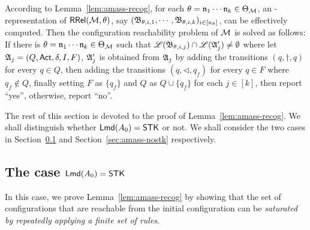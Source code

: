     According to Lemma~\ref{lem:amass-recog}, for each $\theta = \mathfrak{n}_1 \cdots \mathfrak{n}_k \in \Theta_{\mathcal{M} }$, an {\WOTrNFA}-representation of $\mathsf{RRel}({\mathcal{M} }, \theta)$, say $({\mathfrak{B} }_{\theta, i,1},\cdots,{\mathfrak{B} }_{\theta, i,k})_{i \in [n_\theta]}$, can be effectively computed. 
    Then the configuration reachability problem of ${\mathcal{M} }$ is solved as follows: If there is $\theta =  \mathfrak{n}_1 \cdots \mathfrak{n}_k \in \Theta_{\mathcal{M} }$ such that ${\mathscr{L} }({\mathfrak{B} }_{\theta, i, j}) \cap {\mathscr{L} }({\mathfrak{A} }_j') \neq \emptyset$ where let ${\mathfrak{A} }_j = (Q,{\sf Act},\delta,I,F)$, ${\mathfrak{A} }_j'$ is obtained from ${\mathfrak{A} }_j$ by adding the transitions $(q,\dag,q)$ for every $q\in Q$, then adding the transitions $(q,\triangleleft,q_f)$ for every $q\in F$ where $q_f\notin Q$, finally setting $F$ as $\{q_f\}$ and $Q$ as $Q\cup\{q_f\}$ for each $j \in [k]$, then report ``yes'', otherwise, report ``no''.
    
    The rest of this section is devoted to the proof of Lemma~\ref{lem:amass-recog}. We shall distinguish whether ${\sf Lmd}(A_0) = \mathsf{STK}$ or not. 
    We shall consider the two cases in Section~\ref{sec:amass-stk} and Section~\ref{sec:amass-nostk} respectively.
    
    
    
\subsection{The case ${\sf Lmd}(A_0) = \mathsf{STK}$}\label{sec:amass-stk}

In this case, we prove Lemma~\ref{lem:amass-recog} by showing that the set of configurations that are reachable from the initial configuration can be \emph{saturated by repeatedly applying a finite set of rules}. 

